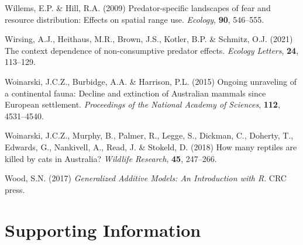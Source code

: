 \documentclass[]{elsarticle} %
\begin{document}
\leavevmode\hypertarget{ref-willems2009predator}{}%
Willems, E.P. \& Hill, R.A. (2009) Predator-specific landscapes of fear and resource distribution: Effects on spatial range use. \emph{Ecology}, \textbf{90}, 546--555.

\leavevmode\hypertarget{ref-wirsing2021context}{}%
Wirsing, A.J., Heithaus, M.R., Brown, J.S., Kotler, B.P. \& Schmitz, O.J. (2021) The context dependence of non-consumptive predator effects. \emph{Ecology Letters}, \textbf{24}, 113--129.

\leavevmode\hypertarget{ref-woinarski2015ongoing}{}%
Woinarski, J.C.Z., Burbidge, A.A. \& Harrison, P.L. (2015) Ongoing unraveling of a continental fauna: Decline and extinction of Australian mammals since European settlement. \emph{Proceedings of the National Academy of Sciences}, \textbf{112}, 4531--4540.

\leavevmode\hypertarget{ref-woinarski2018reptiles}{}%
Woinarski, J.C.Z., Murphy, B., Palmer, R., Legge, S., Dickman, C., Doherty, T., Edwards, G., Nankivell, A., Read, J. \& Stokeld, D. (2018) How many reptiles are killed by cats in Australia? \emph{Wildlife Research}, \textbf{45}, 247--266.

\leavevmode\hypertarget{ref-wood2017generalized}{}%
Wood, S.N. (2017) \emph{Generalized Additive Models: An Introduction with R}. CRC press.

\newpage

\setcounter{table}{0}  \renewcommand{\thetable}{S\arabic{table}} \setcounter{figure}{0} \renewcommand{\thefigure}{S\arabic{figure}} \setcounter{section}{0} \renewcommand{\thesection}{S\arabic{section}}

\hypertarget{supporting-information}{%
\section*{Supporting Information}\label{supporting-information}}

\newpage

\(~\)

\(~\)

\(~\)

\begingroup\fontsize{10}{12}\selectfont
\end{document}
